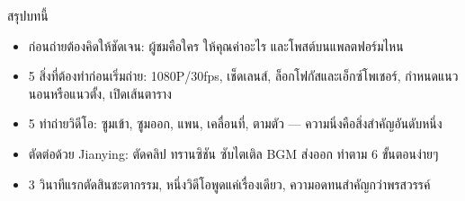\begin{tcbsummary}{สรุปบทนี้}
\begin{itemize}
  \item ก่อนถ่ายต้องคิดให้ชัดเจน: ผู้ชมคือใคร ให้คุณค่าอะไร และโพสต์บนแพลตฟอร์มไหน
  \item 5 สิ่งที่ต้องทำก่อนเริ่มถ่าย: 1080P/30fps, เช็ดเลนส์, ล็อกโฟกัสและเอ็กซ์โพเชอร์, กำหนดแนวนอนหรือแนวตั้ง, เปิดเส้นตาราง
  \item 5 ท่าถ่ายวิดีโอ: ซูมเข้า, ซูมออก, แพน, เคลื่อนที่, ตามตัว — ความนิ่งคือสิ่งสำคัญอันดับหนึ่ง
  \item ตัดต่อด้วย Jianying: ตัดคลิป ทรานซิชัน ซับไตเติล BGM ส่งออก ทำตาม 6 ขั้นตอนง่ายๆ
  \item 3 วินาทีแรกตัดสินชะตากรรม, หนึ่งวิดีโอพูดแค่เรื่องเดียว, ความอดทนสำคัญกว่าพรสวรรค์
\end{itemize}

\end{tcbsummary}
